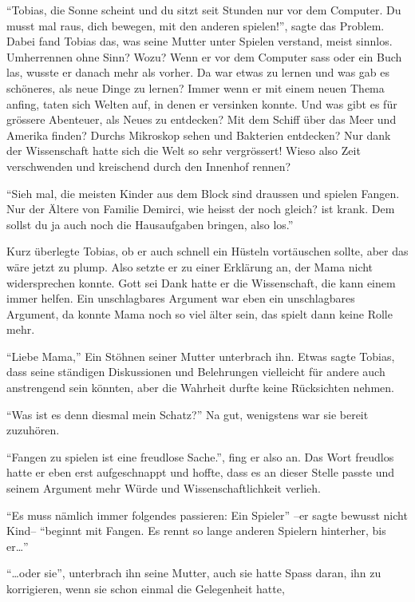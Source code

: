 \enquote{Tobias, die Sonne scheint und du sitzt seit Stunden nur vor dem Computer. Du musst mal raus, dich bewegen, mit den anderen spielen!}, sagte das Problem. Dabei fand Tobias das, was seine Mutter unter Spielen verstand, meist sinnlos. Umherrennen ohne Sinn? Wozu? Wenn er vor dem Computer sass oder ein Buch las, wusste er danach mehr als vorher. Da war etwas zu lernen und was gab es schöneres, als neue Dinge zu lernen? Immer wenn er mit einem neuen Thema anfing, taten sich Welten auf, in denen er versinken konnte. Und was gibt es für grössere Abenteuer, als Neues zu entdecken? Mit dem Schiff über das Meer und Amerika finden? Durchs Mikroskop sehen und Bakterien entdecken? Nur dank der Wissenschaft hatte sich die Welt so sehr vergrössert! Wieso also Zeit verschwenden und kreischend durch den Innenhof rennen?

\enquote{Sieh mal, die meisten Kinder aus dem Block sind draussen und spielen Fangen. Nur der Ältere von Familie Demirci, wie heisst der noch gleich? ist krank. Dem sollst du ja auch noch die Hausaufgaben bringen, also los.}

Kurz überlegte Tobias, ob er auch schnell ein Hüsteln vortäuschen sollte, aber das wäre jetzt zu plump. Also setzte er zu einer Erklärung an, der Mama nicht widersprechen konnte. Gott sei Dank hatte er die Wissenschaft, die kann einem immer helfen. Ein unschlagbares Argument war eben ein unschlagbares Argument, da konnte Mama noch so viel älter sein, das spielt dann keine Rolle mehr.

\enquote{Liebe Mama,} Ein Stöhnen seiner Mutter unterbrach ihn. Etwas sagte Tobias, dass seine ständigen Diskussionen und Belehrungen vielleicht für andere auch anstrengend sein könnten, aber die Wahrheit durfte keine Rücksichten nehmen.

\enquote{Was ist es denn diesmal mein Schatz?} Na gut, wenigstens war sie bereit zuzuhören.

\enquote{Fangen zu spielen ist eine freudlose Sache.}, fing er also an. Das Wort freudlos hatte er eben erst aufgeschnappt und hoffte, dass es an dieser Stelle passte und seinem Argument mehr Würde und Wissenschaftlichkeit verlieh.

\enquote{Es muss nämlich immer folgendes passieren: Ein Spieler} --er sagte bewusst nicht Kind-- \enquote{beginnt mit Fangen. Es rennt so lange anderen Spielern hinterher, bis er\dots}

\enquote{\dots oder sie}, unterbrach ihn seine Mutter, auch sie hatte Spass daran, ihn zu korrigieren, wenn sie schon einmal die Gelegenheit hatte,

